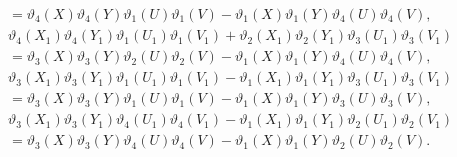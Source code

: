 \documentclass[10pt,leqno]{amsart}
\numberwithin{equation}{section}
\begin{document}
\begin{align}
&=\vartheta_4(X)\vartheta_4(Y)\vartheta_1(U)\vartheta_1(V)-\vartheta_1(X)\vartheta_1(Y)\vartheta_4(U)\vartheta_4(V),\nonumber\\
&\vartheta_4(X_1)\vartheta_4(Y_1)\vartheta_1(U_1)\vartheta_1(V_1)+\vartheta_2(X_1)\vartheta_2(Y_1)\vartheta_3(U_1)\vartheta_3(V_1)\label{pr4-3-4}\\
&=\vartheta_3(X)\vartheta_3(Y)\vartheta_2(U)\vartheta_2(V)-\vartheta_1(X)\vartheta_1(Y)\vartheta_4(U)\vartheta_4(V),\nonumber\\
&\vartheta_3(X_1)\vartheta_3(Y_1)\vartheta_1(U_1)\vartheta_1(V_1)-\vartheta_1(X_1)\vartheta_1(Y_1)\vartheta_3(U_1)\vartheta_3(V_1)\label{pr4-3-6}\\
&=\vartheta_3(X)\vartheta_3(Y)\vartheta_1(U)\vartheta_1(V)-\vartheta_1(X)\vartheta_1(Y)\vartheta_3(U)\vartheta_3(V),\nonumber\\
&\vartheta_3(X_1)\vartheta_3(Y_1)\vartheta_4(U_1)\vartheta_4(V_1)-\vartheta_1(X_1)\vartheta_1(Y_1)\vartheta_2(U_1)\vartheta_2(V_1)\label{pr4-3-7}\\
&=\vartheta_3(X)\vartheta_3(Y)\vartheta_4(U)\vartheta_4(V)-\vartheta_1(X)\vartheta_1(Y)\vartheta_2(U)\vartheta_2(V).\nonumber
\end{align}
\end{document}
